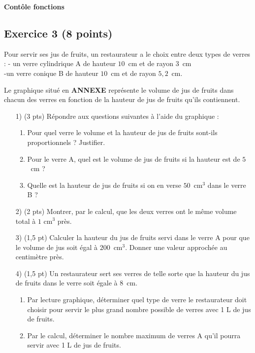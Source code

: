 \documentclass[14 pt, fleqn, pstricks]{extarticle}
\theoremstyle{plain}
\begin{document}
\begin{center} {\Large \textbf{Contôle fonctions}}
\newpage
\subsection*{Exercice 3 (8 points) }

\end{center}

Pour servir ses jus de fruits, un restaurateur a le choix entre deux types de verres :  - un verre cylindrique A de hauteur $10$~cm et de rayon $3$~cm\\ -un verre conique B de hauteur $10$~cm et de rayon $5,2$~cm.


Le graphique situé en \textbf{ANNEXE} représente le volume de jus de fruits dans chacun des verres en fonction de la hauteur de jus de fruits qu'ils contiennent.


\begin{enumerate}
\item[1)] (3 pts) Répondre aux questions suivantes à l'aide du graphique :
	\begin{enumerate}
		\item Pour quel verre le volume et la hauteur de jus de fruits sont-ils proportionnels ? Justifier.
		\item Pour le verre A, quel est le volume de jus de fruits si la hauteur est de $5$~cm ?
		\item Quelle est la hauteur de jus de fruits si on en verse $50$~cm$^3$ dans le verre B ?
 	\end{enumerate}
\item[2)] (2 pts)  Montrer, par le calcul, que les deux verres ont le même volume total à $1$ cm$^3$ près.
\item[3)] (1,5 pt) Calculer la hauteur du jus de fruits servi dans le verre A pour que le volume de jus soit égal à $200$~cm$^3$. Donner une valeur approchée au centimètre près.
\item[4)] (1,5 pt)  Un restaurateur sert ses verres de telle sorte que la hauteur du jus de fruits dans le verre soit égale à $8$~cm.
	\begin{enumerate}
		\item Par lecture graphique, déterminer quel type de verre le restaurateur doit choisir pour servir le plus grand nombre possible de verres avec 1 L de jus de fruits.
		\item Par le calcul, déterminer le nombre maximum de verres A qu'il pourra servir avec 1 L de jus de fruits.
	\end{enumerate}
\end{enumerate}
\end{document}
